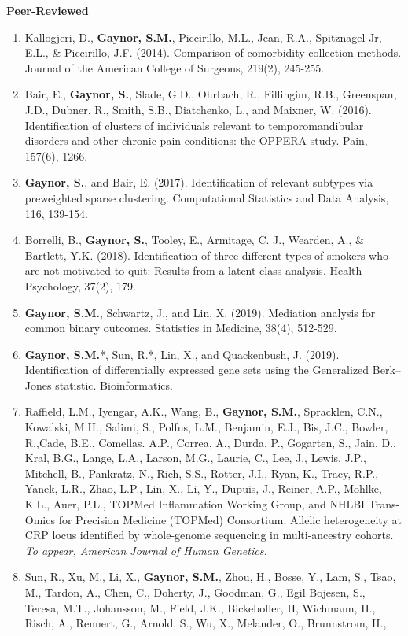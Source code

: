 \documentclass[10pt]{article}
\begin{document}
\indent \textbf{Peer-Reviewed} \\
\begin{enumerate}
\item Kallogjeri, D., \textbf{Gaynor, S.M.}, Piccirillo, M.L., Jean, R.A., Spitznagel Jr, E.L., \& Piccirillo, J.F. (2014). Comparison of comorbidity collection methods. Journal of the American College of Surgeons, 219(2), 245-255.
\item Bair, E., \textbf{Gaynor, S.}, Slade, G.D., Ohrbach, R., Fillingim, R.B., Greenspan, J.D., Dubner, R., Smith, S.B., Diatchenko, L., and Maixner, W. (2016). Identification of clusters of individuals relevant to temporomandibular disorders and other chronic pain conditions: the OPPERA study. Pain, 157(6), 1266.
\item \textbf{Gaynor, S.}, and Bair, E. (2017). Identification of relevant subtypes via preweighted sparse clustering. Computational Statistics and Data Analysis, 116, 139-154.
\item Borrelli, B., \textbf{Gaynor, S.}, Tooley, E., Armitage, C. J., Wearden, A., \& Bartlett, Y.K. (2018). Identification of three different types of smokers who are not motivated to quit: Results from a latent class analysis. Health Psychology, 37(2), 179.
\item \textbf{Gaynor, S.M.}, Schwartz, J., and Lin, X. (2019). Mediation analysis for common binary outcomes. Statistics in Medicine, 38(4), 512-529.
\item \textbf{Gaynor, S.M.}*, Sun, R.*, Lin, X., and Quackenbush, J. (2019). Identification of differentially expressed gene sets using the Generalized Berk–Jones statistic. Bioinformatics.
\item Raffield, L.M.,  Iyengar, A.K.,  Wang, B.,  \textbf{Gaynor, S.M.}, Spracklen, C.N., Kowalski, M.H., Salimi, S., Polfus, L.M., Benjamin, E.J., Bis, J.C., Bowler, R.,Cade, B.E., Comellas. A.P.,  Correa, A.,  Durda, P.,  Gogarten, S.,  Jain, D., Kral, B.G., Lange, L.A.,  Larson, M.G.,  Laurie, C., Lee, J., Lewis, J.P., Mitchell, B.,  Pankratz, N.,  Rich, S.S., Rotter, J.I., Ryan, K., Tracy, R.P., Yanek, L.R.,  Zhao, L.P., Lin, X., Li, Y., Dupuis, J., Reiner, A.P., Mohlke, K.L., Auer, P.L., TOPMed Inflammation Working Group, and NHLBI Trans-Omics for Precision Medicine (TOPMed) Consortium. Allelic heterogeneity at CRP locus identified by whole-genome sequencing in multi-ancestry cohorts. \textit{To appear, American Journal of Human Genetics.} 
\item Sun, R., Xu, M., Li, X., \textbf{Gaynor, S.M.}, Zhou, H., Bosse, Y., Lam, S., Tsao, M., Tardon, A., Chen, C., Doherty, J., Goodman, G., Egil Bojesen, S., Teresa, M.T., Johansson, M., Field, J.K., Bickeboller, H, Wichmann, H., Risch, A., Rennert, G., Arnold, S., Wu, X., Melander, O., Brunnstrom, H.,

\end{enumerate}
\end{document}
